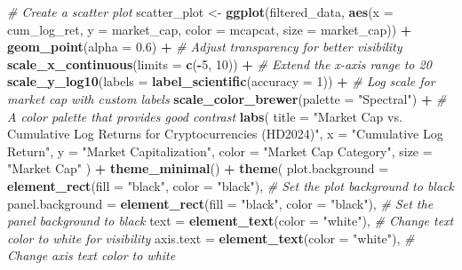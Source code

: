 \documentclass[
]{article}
\newenvironment{Shaded}{\begin{snugshade}}{\end{snugshade}}
\newcommand{\AttributeTok}[1]{\textcolor[rgb]{0.13,0.29,0.53}{#1}}
\newcommand{\CommentTok}[1]{\textcolor[rgb]{0.56,0.35,0.01}{\textit{#1}}}
\newcommand{\DecValTok}[1]{\textcolor[rgb]{0.00,0.00,0.81}{#1}}
\newcommand{\FloatTok}[1]{\textcolor[rgb]{0.00,0.00,0.81}{#1}}
\newcommand{\FunctionTok}[1]{\textcolor[rgb]{0.13,0.29,0.53}{\textbf{#1}}}
\newcommand{\NormalTok}[1]{#1}
\newcommand{\OtherTok}[1]{\textcolor[rgb]{0.56,0.35,0.01}{#1}}
\newcommand{\SpecialCharTok}[1]{\textcolor[rgb]{0.81,0.36,0.00}{\textbf{#1}}}
\newcommand{\StringTok}[1]{\textcolor[rgb]{0.31,0.60,0.02}{#1}}
\begin{document}
\begin{Shaded}
\begin{Highlighting}[]
\CommentTok{\# Create a scatter plot}
\NormalTok{scatter\_plot }\OtherTok{\textless{}{-}} \FunctionTok{ggplot}\NormalTok{(filtered\_data, }\FunctionTok{aes}\NormalTok{(}\AttributeTok{x =}\NormalTok{ cum\_log\_ret, }\AttributeTok{y =}\NormalTok{ market\_cap, }\AttributeTok{color =}\NormalTok{ mcapcat, }\AttributeTok{size =}\NormalTok{ market\_cap)) }\SpecialCharTok{+}
  \FunctionTok{geom\_point}\NormalTok{(}\AttributeTok{alpha =} \FloatTok{0.6}\NormalTok{) }\SpecialCharTok{+}  \CommentTok{\# Adjust transparency for better visibility}
  \FunctionTok{scale\_x\_continuous}\NormalTok{(}\AttributeTok{limits =} \FunctionTok{c}\NormalTok{(}\SpecialCharTok{{-}}\DecValTok{5}\NormalTok{, }\DecValTok{10}\NormalTok{)) }\SpecialCharTok{+}  \CommentTok{\# Extend the x{-}axis range to 20}
  \FunctionTok{scale\_y\_log10}\NormalTok{(}\AttributeTok{labels =} \FunctionTok{label\_scientific}\NormalTok{(}\AttributeTok{accuracy =} \DecValTok{1}\NormalTok{)) }\SpecialCharTok{+}  \CommentTok{\# Log scale for market cap with custom labels}
  \FunctionTok{scale\_color\_brewer}\NormalTok{(}\AttributeTok{palette =} \StringTok{"Spectral"}\NormalTok{) }\SpecialCharTok{+}  \CommentTok{\# A color palette that provides good contrast}
  \FunctionTok{labs}\NormalTok{(}
    \AttributeTok{title =} \StringTok{"Market Cap vs. Cumulative Log Returns for Cryptocurrencies (HD2024)"}\NormalTok{,}
    \AttributeTok{x =} \StringTok{"Cumulative Log Return"}\NormalTok{,}
    \AttributeTok{y =} \StringTok{"Market Capitalization"}\NormalTok{,}
    \AttributeTok{color =} \StringTok{"Market Cap Category"}\NormalTok{,}
    \AttributeTok{size =} \StringTok{"Market Cap"}
\NormalTok{  ) }\SpecialCharTok{+}
  \FunctionTok{theme\_minimal}\NormalTok{() }\SpecialCharTok{+}
  \FunctionTok{theme}\NormalTok{(}
    \AttributeTok{plot.background =} \FunctionTok{element\_rect}\NormalTok{(}\AttributeTok{fill =} \StringTok{"black"}\NormalTok{, }\AttributeTok{color =} \StringTok{"black"}\NormalTok{), }\CommentTok{\# Set the plot background to black}
    \AttributeTok{panel.background =} \FunctionTok{element\_rect}\NormalTok{(}\AttributeTok{fill =} \StringTok{"black"}\NormalTok{, }\AttributeTok{color =} \StringTok{"black"}\NormalTok{), }\CommentTok{\# Set the panel background to black}
    \AttributeTok{text =} \FunctionTok{element\_text}\NormalTok{(}\AttributeTok{color =} \StringTok{"white"}\NormalTok{), }\CommentTok{\# Change text color to white for visibility}
    \AttributeTok{axis.text =} \FunctionTok{element\_text}\NormalTok{(}\AttributeTok{color =} \StringTok{"white"}\NormalTok{), }\CommentTok{\# Change axis text color to white}

\end{Highlighting}
\end{Shaded}
\end{document}
